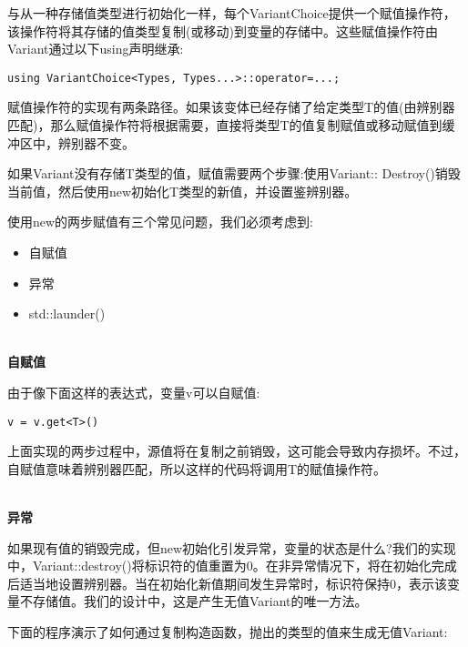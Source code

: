 与从一种存储值类型进行初始化一样，每个VariantChoice提供一个赋值操作符，该操作符将其存储的值类型复制(或移动)到变量的存储中。这些赋值操作符由Variant通过以下using声明继承:

\begin{lstlisting}[style=styleCXX]
using VariantChoice<Types, Types...>::operator=...;
\end{lstlisting}

赋值操作符的实现有两条路径。如果该变体已经存储了给定类型T的值(由辨别器匹配)，那么赋值操作符将根据需要，直接将类型T的值复制赋值或移动赋值到缓冲区中，辨别器不变。

如果Variant没有存储T类型的值，赋值需要两个步骤:使用Variant:: Destroy()销毁当前值，然后使用new初始化T类型的新值，并设置鉴辨别器。

使用new的两步赋值有三个常见问题，我们必须考虑到:

\begin{itemize}
\item
自赋值

\item
异常

\item
std::launder()
\end{itemize}


\hspace*{\fill} \\ %
\noindent
\textbf{自赋值}

由于像下面这样的表达式，变量v可以自赋值:

\begin{lstlisting}[style=styleCXX]
v = v.get<T>()
\end{lstlisting}

上面实现的两步过程中，源值将在复制之前销毁，这可能会导致内存损坏。不过，自赋值意味着辨别器匹配，所以这样的代码将调用T的赋值操作符。

\hspace*{\fill} \\ %
\noindent
\textbf{异常}

如果现有值的销毁完成，但new初始化引发异常，变量的状态是什么?我们的实现中，Variant::destroy()将标识符的值重置为0。在非异常情况下，将在初始化完成后适当地设置辨别器。当在初始化新值期间发生异常时，标识符保持0，表示该变量不存储值。我们的设计中，这是产生无值Variant的唯一方法。

下面的程序演示了如何通过复制构造函数，抛出的类型的值来生成无值Variant:

